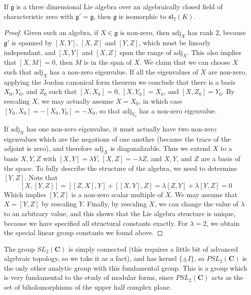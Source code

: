 \begin{theorem}
    If $\mathfrak{g}$ is a three dimensional Lie algebra over an algebraically closed field of characteristic zero with $\mathfrak{g}' = \mathfrak{g}$, then $\mathfrak{g}$ is isomorphic to $\mathfrak{sl}_2(K)$.
\end{theorem}
\begin{proof}
Given such an algebra, if $X \in \mathfrak{g}$ is non-zero, then $\text{adj}_X$ has rank 2, because $\mathfrak{g}'$ is spanned by $[X,Y]$, $[X,Z]$ and $[Y,Z]$, which must be linearly independant, and $[X,Y]$ and $[X,Z]$ span the range of $\text{adj}_X$. This also implies that $[X,M] = 0$, then $M$ is in the span of $X$. We claim that we can choose $X$ such that $\text{adj}_X$ has a non-zero eigenvalue. If all the eigenvalues of $X$ are non-zero, applying the Jordan canonical form theorem we conclude that there is a basis $X_0, Y_0$, and $Z_0$ such that $[X,X_0] = 0$, $[X,Y_0] = X_0$, and $[X,Z_0] = Y_0$. By rescaling $X$, we may actually assume $X = X_0$, in which case $[Y_0,X_0] = -[X_0,Y_0] = -X_0$, so that $\text{adj}_{Y_0}$ has a non-zero eigenvalue.

If $\text{adj}_X$ has one non-zero eigenvalue, it must actually have two non-zero eigenvalues which are the negations of one another (because the trace of the adjoint is zero), and therefore $\text{adj}_X$ is diagonalizable. Thus we extend $X$ to a basis $X,Y,Z$ with $[X,Y] = \lambda Y$, $[X,Z] = -\lambda Z$, and $X,Y$, and $Z$ are a basis of the space. To fully describe the structure of the algebra, we need to determine $[Y,Z]$. Note that
%
\[ [X,[Y,Z]] = [[Z,X],Y] + [[X,Y],Z] = \lambda [Z,Y] + \lambda [Y,Z] = 0 \]
%
Which implies $[Y,Z]$ is a non-zero scalar multiple of $X$. We may assume that $X = [Y,Z]$ by rescaling $Y$. Finally, by rescaling $X$, we can change the value of $\lambda$ to an arbitrary value, and this shows that the Lie algebra structure is unique, because we have specified all structural constants exactly. For $\lambda = 2$, we obtain the special linear group constants we found above.
\end{proof}

The group $SL_2(\mathbf{C})$ is simply connected (this requires a little bit of advanced algebraic topology, so we take it as a fact), and has kernel $\{ \pm I \}$, so $PSL_2(\mathbf{C})$ is the only other analytic group with this fundamental group. This is a group which is very fundamental to the study of modular forms, since $PSL_2(\mathbf{C})$ acts as the set of biholomorphisms of the upper half complex plane.










